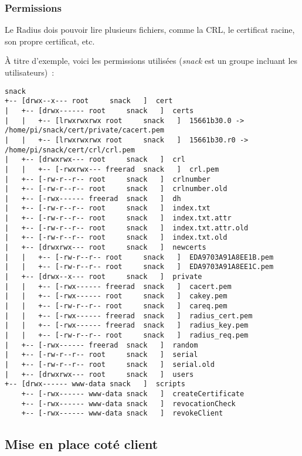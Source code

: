 \subsubsection{Permissions}

Le Radius dois pouvoir lire plusieurs fichiers, comme la CRL, le certificat racine, son propre certificat, etc.

À titre d'exemple, voici les permissions utilisées (\emph{snack} est un groupe incluant les utilisateurs)~:

\begin{lstlisting}
snack
+-- [drwx--x--- root     snack   ]  cert
|   +-- [drwx------ root     snack   ]  certs
|   |   +-- [lrwxrwxrwx root     snack   ]  15661b30.0 -> /home/pi/snack/cert/private/cacert.pem
|   |   +-- [lrwxrwxrwx root     snack   ]  15661b30.r0 -> /home/pi/snack/cert/crl/crl.pem
|   +-- [drwxrwx--- root     snack   ]  crl
|   |   +-- [-rwxrwx--- freerad  snack   ]  crl.pem
|   +-- [-rw-r--r-- root     snack   ]  crlnumber
|   +-- [-rw-r--r-- root     snack   ]  crlnumber.old
|   +-- [-rwx------ freerad  snack   ]  dh
|   +-- [-rw-r--r-- root     snack   ]  index.txt
|   +-- [-rw-r--r-- root     snack   ]  index.txt.attr
|   +-- [-rw-r--r-- root     snack   ]  index.txt.attr.old
|   +-- [-rw-r--r-- root     snack   ]  index.txt.old
|   +-- [drwxrwx--- root     snack   ]  newcerts
|   |   +-- [-rw-r--r-- root     snack   ]  EDA9703A91A8EE1B.pem
|   |   +-- [-rw-r--r-- root     snack   ]  EDA9703A91A8EE1C.pem
|   +-- [drwx--x--- root     snack   ]  private
|   |   +-- [-rwx------ freerad  snack   ]  cacert.pem
|   |   +-- [-rwx------ root     snack   ]  cakey.pem
|   |   +-- [-rw-r--r-- root     snack   ]  careq.pem
|   |   +-- [-rwx------ freerad  snack   ]  radius_cert.pem
|   |   +-- [-rwx------ freerad  snack   ]  radius_key.pem
|   |   +-- [-rw-r--r-- root     snack   ]  radius_req.pem
|   +-- [-rwx------ freerad  snack   ]  random
|   +-- [-rw-r--r-- root     snack   ]  serial
|   +-- [-rw-r--r-- root     snack   ]  serial.old
|   +-- [drwxrwx--- root     snack   ]  users
+-- [drwx------ www-data snack   ]  scripts
    +-- [-rwx------ www-data snack   ]  createCertificate
    +-- [-rwx------ www-data snack   ]  revocationCheck
    +-- [-rwx------ www-data snack   ]  revokeClient
\end{lstlisting}

\subsection{Mise en place coté client}

